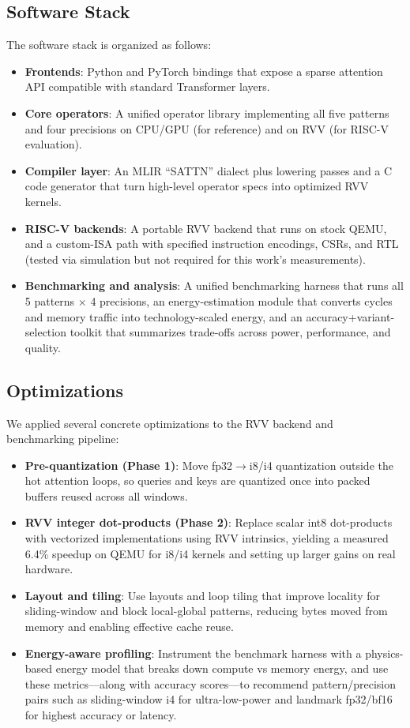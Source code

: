 \documentclass[10pt,conference]{IEEEtran}
\begin{document}
\subsection{Software Stack}
The software stack is organized as follows:
\begin{itemize}
    \item \textbf{Frontends}: Python and PyTorch bindings that expose a sparse attention API compatible with standard Transformer layers.
    \item \textbf{Core operators}: A unified operator library implementing all five patterns and four precisions on CPU/GPU (for reference) and on RVV (for RISC-V evaluation).
    \item \textbf{Compiler layer}: An MLIR ``SATTN'' dialect plus lowering passes and a C code generator that turn high-level operator specs into optimized RVV kernels.
    \item \textbf{RISC-V backends}: A portable RVV backend that runs on stock QEMU, and a custom-ISA path with specified instruction encodings, CSRs, and RTL (tested via simulation but not required for this work's measurements).
    \item \textbf{Benchmarking and analysis}: A unified benchmarking harness that runs all 5 patterns $\times$ 4 precisions, an energy-estimation module that converts cycles and memory traffic into technology-scaled energy, and an accuracy+variant-selection toolkit that summarizes trade-offs across power, performance, and quality.
\end{itemize}

\subsection{Optimizations}
We applied several concrete optimizations to the RVV backend and benchmarking pipeline:
\begin{itemize}
    \item \textbf{Pre-quantization (Phase 1)}: Move fp32$\rightarrow$i8/i4 quantization outside the hot attention loops, so queries and keys are quantized once into packed buffers reused across all windows.
    \item \textbf{RVV integer dot-products (Phase 2)}: Replace scalar int8 dot-products with vectorized implementations using RVV intrinsics, yielding a measured 6.4\% speedup on QEMU for i8/i4 kernels and setting up larger gains on real hardware.
    \item \textbf{Layout and tiling}: Use layouts and loop tiling that improve locality for sliding-window and block local-global patterns, reducing bytes moved from memory and enabling effective cache reuse.
    \item \textbf{Energy-aware profiling}: Instrument the benchmark harness with a physics-based energy model that breaks down compute vs memory energy, and use these metrics---along with accuracy scores---to recommend pattern/precision pairs such as sliding-window i4 for ultra-low-power and landmark fp32/bf16 for highest accuracy or latency.
\end{itemize}
\end{document}
